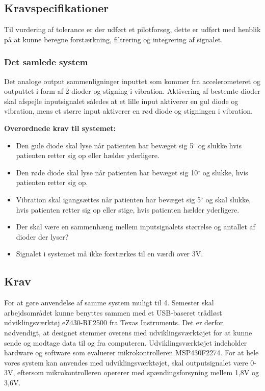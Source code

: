 \subsection{Kravspecifikationer}
Til vurdering af tolerance er der udført et pilotforsøg, dette er udført med henblik på at kunne beregne forstærkning, filtrering og integrering af signalet. 

\subsubsection{Det samlede system}
Det analoge output sammenligninger inputtet som kommer fra accelerometeret og outputtet i form af 2 dioder og stigning i vibration. Aktivering af bestemte dioder skal afspejle inputsignalet således at et lille input aktiverer en gul diode og vibration, mens et større input aktiverer en rød diode og stigningen i vibration. 

\textbf{Overordnede krav til systemet:}
\begin{itemize}
\item Den gule diode skal lyse når patienten har bevæget sig 5$^{\circ}$ og slukke hvis patienten retter sig op eller hælder yderligere.
\item Den røde diode skal lyse når patienten har bevæget sig 10$^{\circ}$ og slukke, hvis patienten retter sig op.
\item Vibration skal igangsættes når patienten har bevæget sig 5$^{\circ}$ og skal slukke, hvis patienten retter sig op eller stige, hvis patienten hælder yderligere.
\item Der skal være en sammenhæng mellem inputsignalets størrelse og antallet af dioder der lyser?
\item Signalet i systemet må ikke forstærkes til en værdi over 3V.
\end{itemize}

\subsection{Krav}
For at gøre anvendelse af samme system muligt til 4. Semester skal arbejdsområdet kunne benyttes sammen med et USB-baseret trådløst udviklingsværktøj eZ430-RF2500 fra Texas Instruments. Det er derfor nødvendigt, at designet stemmer overens med udviklingsværktøjet for at kunne sende og modtage data til og fra computeren. Udviklingsværktøjet indeholder hardware og software som evaluerer mikrokontrolleren MSP430F2274. For at hele vores system kan anvendes med udviklingsværktøjet, skal outputsignalet være 0-3V, eftersom mikrokontrolleren opererer med spændingsforsyning mellem 1,8V og 3,6V.

